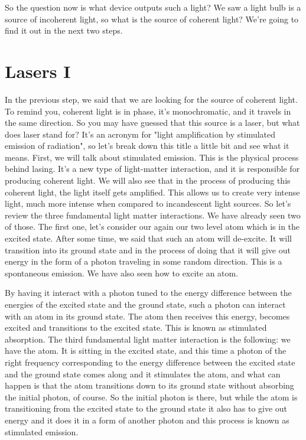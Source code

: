 So the question now is what device outputs such a light? We saw a light bulb is a source of incoherent light, so what is the source of  coherent light? We're going to find it out in the next two steps.

\section{Lasers I}


In the previous step, we said that we are looking for the source of coherent light. To remind you, coherent light is in phase, it's monochromatic, and it travels in the same direction. So you may have guessed that this source is a laser, but what does laser stand for? It's an acronym for "light amplification by stimulated emission of radiation", so let's break down this title a little bit and see what it means. First, we will talk about stimulated emission. This is the physical process behind lasing. It's a new type of light-matter interaction, and it is responsible for producing coherent light. We will also see that in the process of producing this coherent light, the light itself gets amplified. This allows us to create very intense light, much more intense when compared to incandescent light sources. So let's review the three fundamental light matter interactions. We have already seen two of those. The first one, let's consider our again our two level atom which is in the excited state. After some time, we said that such an atom will de-excite. It will transition into its ground state and in the process of doing that it will give out energy in the form of a photon traveling in some random direction. This is a spontaneous emission. We have also seen how to excite an atom.

By having it interact with a photon tuned to the energy difference between the energies of the excited state and the ground state, such a photon can interact with an atom in its ground state. The atom then receives this energy, becomes excited and transitions to the excited state. This is known as stimulated absorption. The third fundamental light matter interaction is the following: we have the atom. It is sitting in the excited state, and this time a photon of the right frequency corresponding to the energy difference between the excited state and the ground state comes along and it stimulates the atom, and what can happen is that the atom transitions down to its ground state without absorbing the initial photon, of course. So the initial photon is there, but while the atom is transitioning from the excited state to the ground state it also has to give out energy and it does it in a form of another photon and this process is known as stimulated emission.

